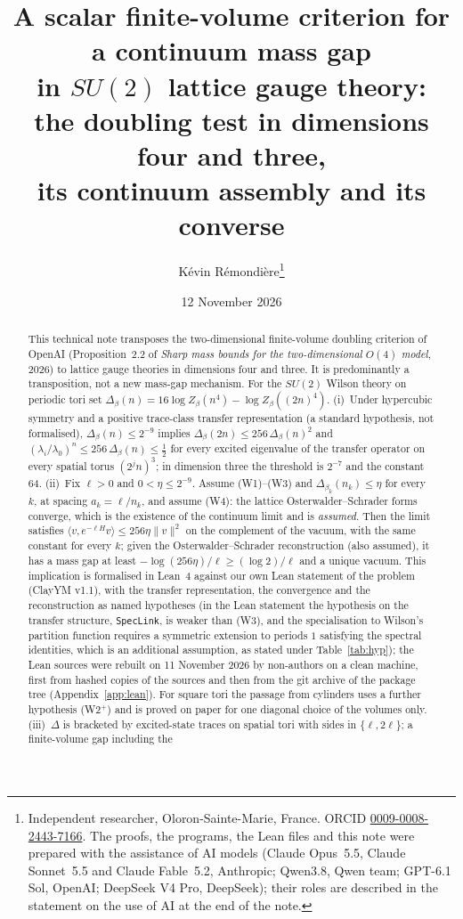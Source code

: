 \documentclass[11pt,a4paper]{article}
\title{A scalar finite-volume criterion for a continuum mass gap\\ in $SU(2)$ lattice gauge theory:\\ the doubling test in dimensions four and three,\\ its continuum assembly and its converse}
\author{K\'evin R\'emondi\`ere\thanks{Independent researcher, Oloron-Sainte-Marie, France. ORCID
\href{https://orcid.org/0009-0008-2443-7166}{0009-0008-2443-7166}. The proofs, the programs, the Lean files and this note were
prepared with the assistance of AI models (Claude Opus~5.5, Claude Sonnet~5.5 and Claude Fable~5.2, Anthropic; Qwen3.8, Qwen team; GPT-6.1 Sol, OpenAI; DeepSeek V4 Pro, DeepSeek); their roles are described in the
statement on the use of AI at the end of the note.}}
\date{12 November 2026}
\theoremstyle{plain}
\theoremstyle{definition}
\theoremstyle{remark}
\numberwithin{equation}{section}
\begin{document}
\maketitle

\begin{abstract}
This technical note transposes the two-dimensional finite-volume doubling criterion of OpenAI (Proposition~2.2 of \emph{Sharp mass bounds
for the two-dimensional $O(4)$ model}, 2026) to lattice gauge theories in dimensions four and three. It is predominantly a transposition,
not a new mass-gap mechanism. For the $SU(2)$ Wilson theory on periodic tori set
$\Delta_\beta(n)=16\log Z_\beta(n^4)-\log Z_\beta((2n)^4)$.
(i)~Under hypercubic symmetry and a positive trace-class transfer representation (a standard hypothesis, not formalised),
$\Delta_\beta(n)\le2^{-9}$ implies $\Delta_\beta(2n)\le256\,\Delta_\beta(n)^2$ and
$(\lambda_i/\lambda_0)^n\le256\,\Delta_\beta(n)\le\frac12$ for every excited eigenvalue of the transfer operator on every spatial torus
$(2^jn)^3$; in dimension three the threshold is $2^{-7}$ and the constant $64$.
(ii)~Fix $\ell>0$ and $0<\eta\le2^{-9}$. Assume (W1)--(W3) and $\Delta_{\beta_k}(n_k)\le\eta$ for every $k$, at spacing $a_k=\ell/n_k$, and assume (W4): the lattice
Osterwalder--Schrader forms converge, which is the existence of the continuum limit and is \emph{assumed}. Then the limit satisfies
$\langle v,e^{-\ell H}v\rangle\le256\eta\|v\|^2$ on the complement of the vacuum, with the same constant for every $k$; given the
Osterwalder--Schrader reconstruction (also assumed), it has a mass gap at least $-\log(256\eta)/\ell\ge(\log2)/\ell$ and a unique vacuum.
This implication is formalised in Lean~4 against our own Lean statement of the problem (ClayYM v1.1), with the transfer representation, the
convergence and the reconstruction as named hypotheses (in the Lean statement the hypothesis on the transfer structure, \texttt{SpecLink}, is weaker than (W3), and the specialisation to Wilson's partition function requires a symmetric extension to periods $1$ satisfying the spectral identities, which is an additional assumption, as stated under Table~\ref{tab:hyp}); the Lean sources were rebuilt on 11 November 2026 by non-authors on a clean
machine, first from hashed copies of the sources and then from the git archive of the package tree (Appendix~\ref{app:lean}). For square tori the passage from cylinders uses a further hypothesis (W2$^+$) and is proved on paper for one
diagonal choice of the volumes only.
(iii)~$\Delta$ is bracketed by excited-state traces on spatial tori with sides in $\{\ell,2\ell\}$; a finite-volume gap including the

\end{abstract}
\end{document}
